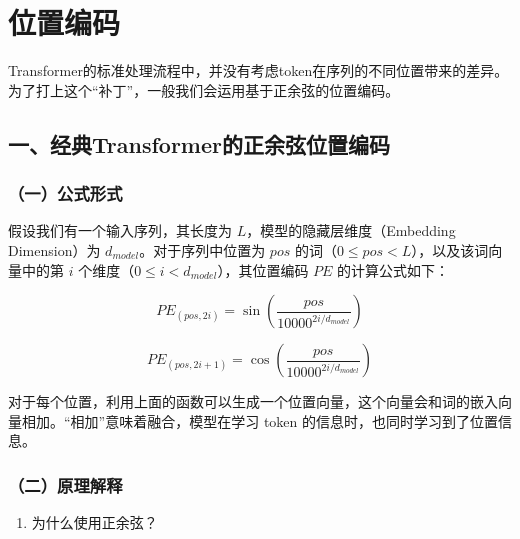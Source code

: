 \setcounter{section}{3}

\hypertarget{ux4f4dux7f6eux7f16ux7801}{%
\section{位置编码}\label{ux4f4dux7f6eux7f16ux7801}}

Transformer的标准处理流程中，并没有考虑token在序列的不同位置带来的差异。为了打上这个``补丁''，一般我们会运用基于正余弦的位置编码。

\hypertarget{ux4e00ux7ecfux5178transformerux7684ux6b63ux4f59ux5f26ux4f4dux7f6eux7f16ux7801}{%
\subsection{一、经典Transformer的正余弦位置编码}\label{ux4e00ux7ecfux5178transformerux7684ux6b63ux4f59ux5f26ux4f4dux7f6eux7f16ux7801}}

\hypertarget{ux4e00ux516cux5f0fux5f62ux5f0f}{%
\subsubsection{（一）公式形式}\label{ux4e00ux516cux5f0fux5f62ux5f0f}}

假设我们有一个输入序列，其长度为 \(L\)，模型的隐藏层维度（Embedding Dimension）为 \(d_{model}\)。对于序列中位置为 \(pos\) 的词（\(0 \le pos < L\)），以及该词向量中的第 \(i\) 个维度（\(0 \le i < d_{model}\)），其位置编码 \(PE\) 的计算公式如下：

\[
PE_{(pos,2i)}=\sin\left(\frac{pos}{10000^{2i/d_{model}}}\right)
\]

\[
PE_{(pos,2i+1)}=\cos\left(\frac{pos}{10000^{2i/d_{model}}}\right)
\]

对于每个位置，利用上面的函数可以生成一个位置向量，这个向量会和词的嵌入向量相加。``相加''意味着融合，模型在学习 token 的信息时，也同时学习到了位置信息。

\hypertarget{ux4e8cux539fux7406ux89e3ux91ca}{%
\subsubsection{（二）原理解释}\label{ux4e8cux539fux7406ux89e3ux91ca}}

\begin{enumerate}
\def\labelenumi{\arabic{enumi}.}
\tightlist
\item
  为什么使用正余弦？
\end{enumerate}

